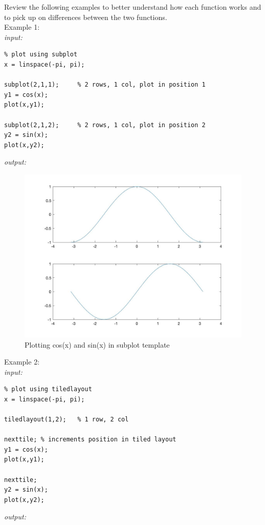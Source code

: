 \documentclass[../MATLAB_Primer.tex]{subfiles}
\begin{document}
Review the following examples to better understand how each function works and to pick up on differences between the two functions.\\

Example 1:\\

\textit{input:}
\begin{lstlisting}
% plot using subplot 
x = linspace(-pi, pi);

subplot(2,1,1);     % 2 rows, 1 col, plot in position 1
y1 = cos(x);
plot(x,y1);

subplot(2,1,2);     % 2 rows, 1 col, plot in position 2
y2 = sin(x);
plot(x,y2);
\end{lstlisting}
\textit{output:}

\begin{figure}[H]
    \centering
    \includegraphics[width=350pt]{images/plotting_example5.jpg}
    \caption{Plotting cos(x) and sin(x) in subplot template}
    \label{fig:plotting_example5}
\end{figure}

Example 2:\\

\textit{input:}
\begin{lstlisting}
% plot using tiledlayout
x = linspace(-pi, pi);

tiledlayout(1,2);   % 1 row, 2 col

nexttile; % increments position in tiled layout
y1 = cos(x);
plot(x,y1);

nexttile;
y2 = sin(x);
plot(x,y2);

\end{lstlisting}
\textit{output:}
\end{document}
